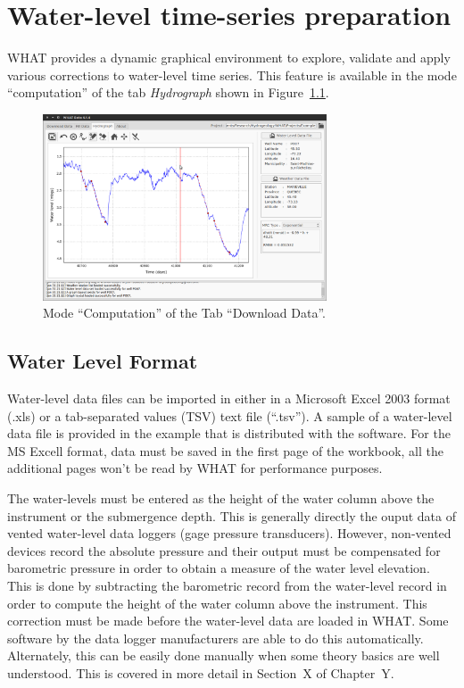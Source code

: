 \documentclass[WHATMANUAL.tex]{subfiles}
\begin{document}
\chapter{Water-level time-series preparation}

WHAT provides a dynamic graphical environment to explore, validate and apply various corrections to water-level time series. This feature is available in the mode ``computation'' of the tab \emph{Hydrograph} shown in Figure~\ref{fig:tab_hydrograph_computation}.

\begin{figure}[h!]
\centering
\includegraphics[width=0.75\textwidth]{img/WHAT_Screenshot003}
\caption[Tab ``Download Data''.]{Mode ``Computation'' of the Tab ``Download Data''.}
\label{fig:tab_hydrograph_computation}
\end{figure}

\section{Water Level Format}

Water-level data files can be imported in either in a Microsoft Excel 2003 format (.xls) or a tab-separated values (TSV) text file (``.tsv''). A sample of a water-level data file is provided in the example that is distributed with the software. For the MS Excell format, data must be saved in the first page of the workbook, all the additional pages won't be read by WHAT for performance purposes.

The water-levels must be entered as the height of the water column above the instrument or the submergence depth. This is generally directly the ouput data of vented water-level data loggers (gage pressure transducers). However, non-vented devices record the absolute pressure and their output must be compensated for barometric pressure in order to obtain a measure of the water level elevation. This is done by subtracting the barometric record from the water-level record in order to compute the height of the water column above the instrument. This correction must be made before the water-level data are loaded in WHAT. Some software by the data logger manufacturers are able to do this automatically. Alternately, this can be easily done manually when some theory basics are well understood. This is covered in more detail in Section~X of Chapter~Y.
\end{document}
